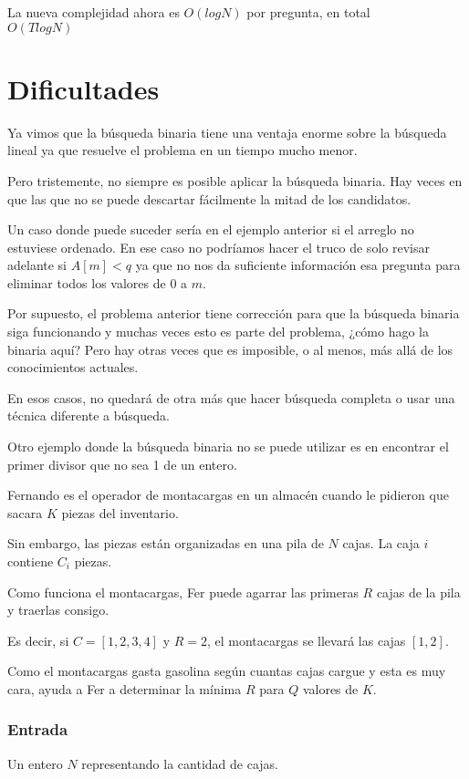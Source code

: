 La nueva complejidad ahora es \(O(logN)\) por pregunta, en total\\ \(O(TlogN)\)

\section*{Dificultades}
Ya vimos que la búsqueda binaria tiene una ventaja enorme sobre la búsqueda lineal ya que resuelve el problema en un tiempo mucho menor.

Pero tristemente, no siempre es posible aplicar la búsqueda binaria. Hay veces en que las que no se puede descartar fácilmente la mitad de los candidatos.

Un caso donde puede suceder sería en el ejemplo anterior si el arreglo no estuviese ordenado. En ese caso no podríamos hacer el truco de solo revisar adelante si \(A[m]<q\) ya que no nos da suficiente información esa pregunta para eliminar todos los valores de \(0\) a \(m\).

Por supuesto, el problema anterior tiene corrección para que la búsqueda binaria siga funcionando y muchas veces esto es parte del problema, ¿cómo hago la binaria aquí? Pero hay otras veces que es imposible, o al menos, más allá de los conocimientos actuales.

En esos casos, no quedará de otra más que hacer búsqueda completa o usar una técnica diferente a búsqueda.

Otro ejemplo donde la búsqueda binaria no se puede utilizar es en encontrar el primer divisor que no sea 1 de un entero.
\newpage


\problemtitle Fernando es el operador de montacargas en un almacén cuando le pidieron que sacara \(K\) piezas del inventario.

Sin embargo, las piezas están organizadas en una pila de \(N\) cajas. La caja \(i\) contiene \(C_i\) piezas.

Como funciona el montacargas, Fer puede agarrar las primeras \(R\) cajas de la pila y traerlas consigo.

Es decir, si \(C=[1,2,3,4]\) y \(R=2\), el montacargas se llevará las cajas \([1,2]\).

Como el montacargas gasta gasolina según cuantas cajas cargue y esta es muy cara, ayuda a Fer a determinar la mínima \(R\) para \(Q\) valores de \(K\).

\subsubsection*{Entrada}
Un entero \(N\) representando la cantidad de cajas.

